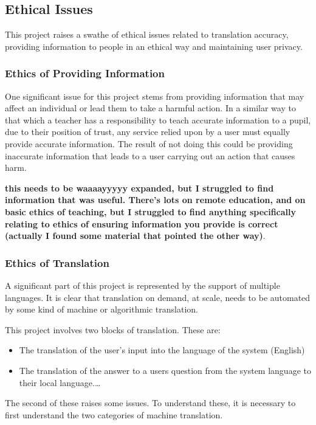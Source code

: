 \documentclass{article}
\begin{document}

\subsection{Ethical Issues}
This project raises a swathe of ethical issues related to translation accuracy, providing information to people in an ethical way and maintaining user privacy.

\subsubsection{Ethics of Providing Information}
One significant issue for this project stems from providing information that may affect an individual or lead them to take a harmful action.  In a similar way to that which a teacher has a responsibility to teach accurate information to a pupil, due to their position of trust, any service relied upon by a user must equally provide accurate information.  The result of not doing this could be providing inaccurate information that leads to a user carrying out an action that causes harm.


{\bf this needs to be waaaayyyyy expanded, but I struggled to find information that was useful.  There's lots on remote education, and on basic ethics of teaching, but I struggled to find anything specifically relating to ethics of ensuring information you provide is correct (actually I found some material that pointed the other way)}.

\subsubsection{Ethics of Translation}
A significant part of this project is represented by the support of multiple languages.  It is clear that translation on demand, at scale, needs to be automated by some kind of machine or algorithmic translation.

This project involves two blocks of translation.  These are:
\begin{itemize}
  \item The translation of the user's input into the language of the system (English)
  \item The translation of the answer to a users question from the system language to their local language.\ldots
\end{itemize}
The second of these raises some issues.  To understand these, it is necessary to first understand the two categories of machine translation.
\end{document}
